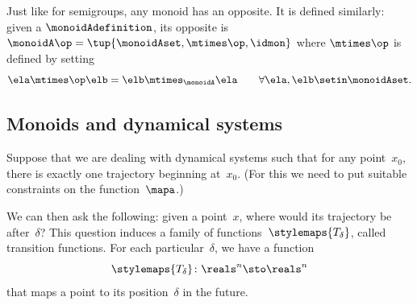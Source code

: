 \begin{remark}
    Just like for semigroups, any monoid has an opposite.
    It is defined similarly: given a  $\monoidAdefinition$, its opposite is $\monoidA \op = \tup{ \monoidAset, \mtimes\op, \idmon }$ where $\mtimes\op$ is defined by setting
    \begin{equation}
        \ela \mtimes \op \elb = \elb \mtimes_{\monoidA} \ela \qquad \forall \ela, \elb \setin \monoidAset.
    \end{equation}
\end{remark}

\subsection{Monoids and dynamical systems}
\label{sub:transition-functions}


Suppose that we are dealing with dynamical systems such that for any point~$x_0$, there is exactly one trajectory beginning at~$x_0$.
(For this we need to put suitable constraints on the function~$\mapa$.)

We can then ask the following: given a point~$x$, where would its trajectory be after~$\delta$?
This question induces a family of functions~$\stylemaps{T_\delta}$, called transition functions.
For each particular~$\delta$, we have a function
\begin{equation}
    \stylemaps{T_{\delta}}\colon \reals^n \sto \reals^n
\end{equation}
that maps a point to its position~$\delta$ in the future.

